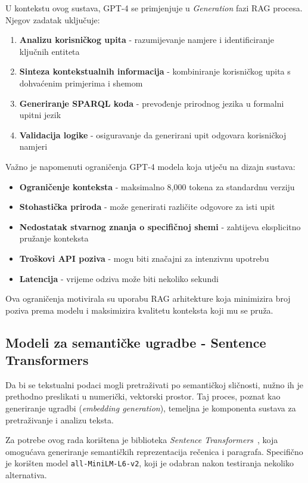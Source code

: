 U kontekstu ovog sustava, GPT-4 se primjenjuje u \textit{Generation} fazi RAG procesa. Njegov zadatak uključuje:

\begin{enumerate}
    \item \textbf{Analizu korisničkog upita} - razumijevanje namjere i identificiranje ključnih entiteta
    \item \textbf{Sinteza kontekstualnih informacija} - kombiniranje korisničkog upita s dohvaćenim primjerima i shemom
    \item \textbf{Generiranje SPARQL koda} - prevođenje prirodnog jezika u formalni upitni jezik
    \item \textbf{Validacija logike} - osiguravanje da generirani upit odgovara korisničkoj namjeri
\end{enumerate}

Važno je napomenuti ograničenja GPT-4 modela koja utječu na dizajn sustava:

\begin{itemize}
    \item \textbf{Ograničenje konteksta} - maksimalno 8,000 tokena za standardnu verziju
    \item \textbf{Stohastička priroda} - može generirati različite odgovore za isti upit
    \item \textbf{Nedostatak stvarnog znanja o specifičnoj shemi} - zahtijeva eksplicitno pružanje konteksta
    \item \textbf{Troškovi API poziva} - mogu biti značajni za intenzivnu upotrebu
    \item \textbf{Latencija} - vrijeme odziva može biti nekoliko sekundi
\end{itemize}

Ova ograničenja motivirala su uporabu RAG arhitekture koja minimizira broj poziva prema modelu i maksimizira kvalitetu konteksta koji mu se pruža.

\subsection{Modeli za semantičke ugradbe - Sentence Transformers}

Da bi se tekstualni podaci mogli pretraživati po semantičkoj sličnosti, nužno ih je prethodno preslikati u numerički, vektorski prostor. Taj proces, poznat kao generiranje ugradbi (\textit{embedding generation}), temeljna je komponenta sustava za pretraživanje i analizu teksta.

Za potrebe ovog rada korištena je biblioteka \textit{Sentence Transformers}~\cite{reimers2019sentence}, koja omogućava generiranje semantičkih reprezentacija rečenica i paragrafa. Specifično je korišten model \texttt{all-MiniLM-L6-v2}, koji je odabran nakon testiranja nekoliko alternativa.

